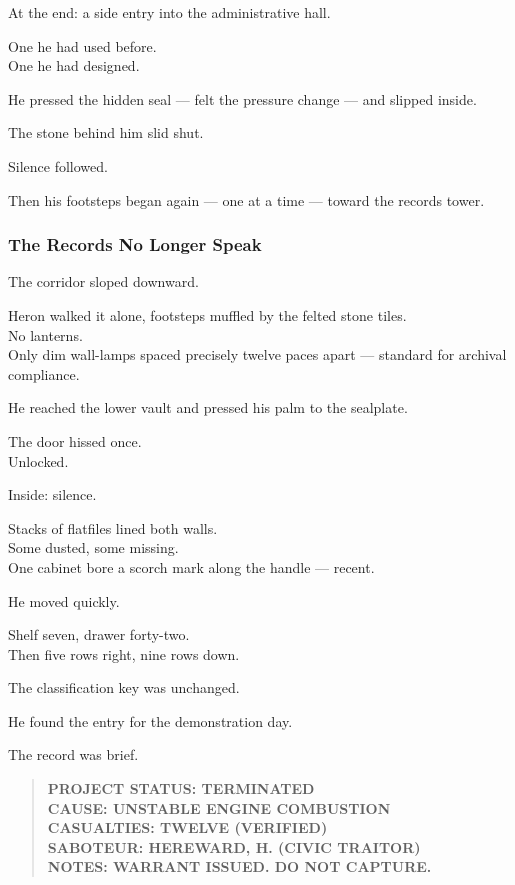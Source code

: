\documentclass[12pt]{article}
\begin{document}
At the end: a side entry into the administrative hall.

One he had used before.\\
One he had designed.

He pressed the hidden seal — felt the pressure change — and slipped inside.

\vspace{1em}

The stone behind him slid shut.

Silence followed.

Then his footsteps began again — one at a time — toward the records tower.

\dotfill

\subsubsection*{The Records No Longer Speak}

The corridor sloped downward.

Heron walked it alone, footsteps muffled by the felted stone tiles.\\
No lanterns.\\
Only dim wall-lamps spaced precisely twelve paces apart — standard for archival compliance.

He reached the lower vault and pressed his palm to the sealplate.

The door hissed once.\\
Unlocked.

\vspace{1em}

Inside: silence.

Stacks of flatfiles lined both walls.\\
Some dusted, some missing.\\
One cabinet bore a scorch mark along the handle — recent.

He moved quickly.

Shelf seven, drawer forty-two.\\
Then five rows right, nine rows down.

The classification key was unchanged.

\vspace{1em}

He found the entry for the demonstration day.

The record was brief.

\begin{quote}
\textbf{PROJECT STATUS: TERMINATED}\\
\textbf{CAUSE: UNSTABLE ENGINE COMBUSTION}\\
\textbf{CASUALTIES: TWELVE (VERIFIED)}\\
\textbf{SABOTEUR: HEREWARD, H. (CIVIC TRAITOR)}\\
\textbf{NOTES: WARRANT ISSUED. DO NOT CAPTURE.}
\end{quote}
\end{document}
